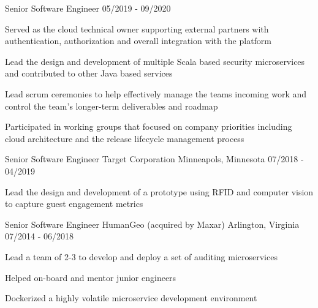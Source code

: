 \begin{cventries}
  \cventry
    {Senior Software Engineer} %
    {} %
    {} %
    {05/2019 - 09/2020} %
    {
      \begin{cvitems} %
        \item {Served as the cloud technical owner supporting external partners with authentication, authorization and overall integration with the platform}
        \item {Lead the design and development of multiple Scala based security microservices and contributed to other Java based services}
        \item {Lead scrum ceremonies to help effectively manage the teams incoming work and control the team's longer-term deliverables and roadmap}
        \item {Participated in working groups that focused on company priorities including cloud architecture and the release lifecycle management process}
      \end{cvitems}
    }

  \cventry
    {Senior Software Engineer} %
    {Target Corporation} %
    {Minneapols, Minnesota} %
    {07/2018 - 04/2019} %
    {
      \begin{cvitems} %
        \item {Lead the design and development of a prototype using RFID and computer vision to capture guest engagement metrics}
      \end{cvitems}
    }

  \cventry
    {Senior Software Engineer} %
    {HumanGeo (acquired by Maxar)} %
    {Arlington, Virginia} %
    {07/2014 - 06/2018} %
    {
      \begin{cvitems} %
        \item {Lead a team of 2-3 to develop and deploy a set of auditing microservices}
        \item {Helped on-board and mentor junior engineers}
        \item {Dockerized a highly volatile microservice development environment}
      \end{cvitems}
    }


\end{cventries}
